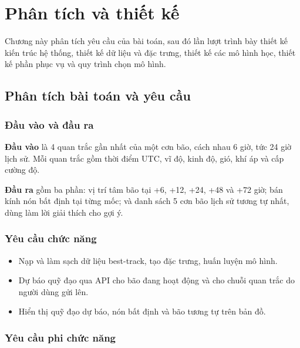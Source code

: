 \chapter{Phân tích và thiết kế}
\label{ch:thietke}

\begin{muctieu}
Chương này phân tích yêu cầu của bài toán, sau đó lần lượt trình bày thiết kế
kiến trúc hệ thống, thiết kế dữ liệu và đặc trưng, thiết kế các mô hình học,
thiết kế phần phục vụ và quy trình chọn mô hình.
\end{muctieu}

\section{Phân tích bài toán và yêu cầu}

\subsection{Đầu vào và đầu ra}

\textbf{Đầu vào} là 4 quan trắc gần nhất của một cơn bão, cách nhau 6 giờ,
tức 24 giờ lịch sử. Mỗi quan trắc gồm thời điểm UTC, vĩ độ, kinh độ, gió, khí
áp và cấp cường độ.

\textbf{Đầu ra} gồm ba phần: vị trí tâm bão tại +6, +12, +24, +48 và +72 giờ;
bán kính nón bất định tại từng mốc; và danh sách 5 cơn bão lịch sử tương tự
nhất, dùng làm lời giải thích cho gợi ý.

\subsection{Yêu cầu chức năng}

\begin{itemize}[leftmargin=1.6em, itemsep=2pt]
  \item Nạp và làm sạch dữ liệu best-track, tạo đặc trưng, huấn luyện mô hình.
  \item Dự báo quỹ đạo qua API cho bão đang hoạt động và cho chuỗi quan trắc
        do người dùng gửi lên.
  \item Hiển thị quỹ đạo dự báo, nón bất định và bão tương tự trên bản đồ.
\end{itemize}

\subsection{Yêu cầu phi chức năng}

